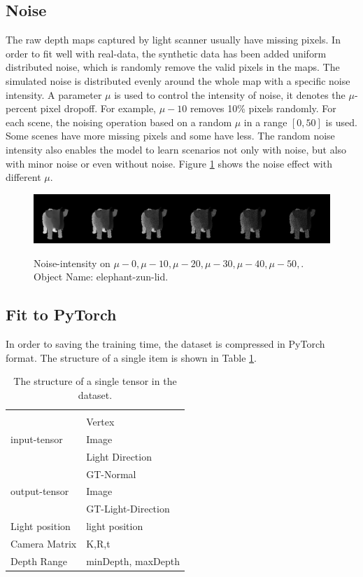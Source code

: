 \subsection{Noise}
\label{sec:noise}
The raw depth maps captured by light scanner usually have missing pixels. In order to fit well with real-data, the synthetic data has been added uniform distributed noise, which is randomly remove the valid pixels in the maps.
The simulated noise is distributed evenly around the whole map with a specific noise intensity. A parameter $ \mu $ is used to control the intensity of noise, it denotes the $ \mu $-percent pixel dropoff. For example, $ \mu-10 $ removes 10\% pixels randomly. For each scene, the noising operation based on a random $ \mu $ in a range $ \left[0, 50\right]  $ is used. Some scenes have more missing pixels and some have less. The random noise intensity also enables the model to learn scenarios not only with noise, but also with minor noise or even without noise.
Figure \ref{fig:noise-intensity} shows the noise effect with different $ \mu $.
\begin{figure}[!h]
	\centering
	{\includegraphics[width=.9\textwidth]{./Figures/add_noise_depth.png}}
	\caption{Noise-intensity on $ \mu-0, \mu-10,\mu-20, \mu-30, \mu-40, \mu-50,$. Object Name: elephant-zun-lid.}
	\label{fig:noise-intensity}
\end{figure}


\subsection{Fit to PyTorch}
In order to saving the training time, the dataset is compressed in PyTorch format. The structure of a single item is shown in Table \ref{tab:tensor-structure}.
\begin{table}[H]
	\caption{The structure of a single tensor in the dataset.}
	\label{tab:tensor-structure}
	\centering
	\begin{tabular}{l | l}
		\tabhead{Name} & \tabhead{Content} \\
		\multirow{3}{*}{input-tensor}  & Vertex \\  & Image \\  & Light Direction \\
		\hline
		\multirow{3}{*}{output-tensor}  & GT-Normal \\ & Image \\ & GT-Light-Direction \\
		\hline
		Light position & light position \\
		\hline 
		Camera Matrix  & K,R,t\\
		\hline 
		Depth Range  & minDepth, maxDepth\\
	\end{tabular}
\end{table}
